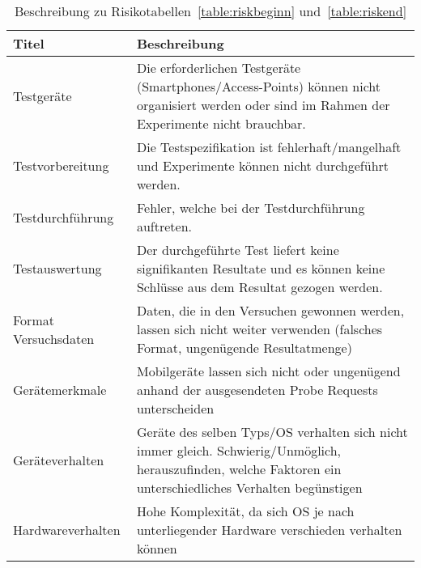 \begin{landscape}
\begin{table}[h!]
    \tiny  
	\centering
	\begin{tabularx}{\linewidth}{l X}
        \toprule 
        \textbf{Titel} & \textbf{Beschreibung}  \\
        \midrule 
        Testgeräte & Die erforderlichen Testgeräte (Smartphones/Access-Points) können nicht organisiert werden oder sind im Rahmen der Experimente nicht brauchbar. \\ 
        \midrule 
        Testvorbereitung & Die Testspezifikation ist fehlerhaft/mangelhaft und Experimente können nicht durchgeführt werden.  \\ 
        \midrule 
        Testdurchführung & Fehler, welche bei der Testdurchführung auftreten.  \\ 
        \midrule 
        Testauswertung & Der durchgeführte Test liefert keine signifikanten Resultate und es können keine Schlüsse aus dem Resultat gezogen werden.  \\ 
        \midrule 
        Format Versuchsdaten & Daten, die in den Versuchen gewonnen werden, lassen sich nicht weiter verwenden (falsches Format, ungenügende Resultatmenge)  \\ 
        \midrule 
        Gerätemerkmale & Mobilgeräte lassen sich nicht oder ungenügend anhand der ausgesendeten Probe Requests unterscheiden \\ 
        \midrule 
        Geräteverhalten & Geräte des selben Typs/OS verhalten sich nicht immer gleich. Schwierig/Unmöglich, herauszufinden, welche Faktoren ein unterschiedliches Verhalten begünstigen  \\ 
        \midrule 
        Hardwareverhalten & Hohe Komplexität, da sich OS je nach unterliegender Hardware verschieden verhalten können  \\
		\bottomrule 
	\end{tabularx} 
	\caption{Beschreibung zu Risikotabellen~\ref{table:riskbeginn} und~\ref{table:riskend}
	\label{table:riskdescription}} 
\end{table}
\end{landscape}



